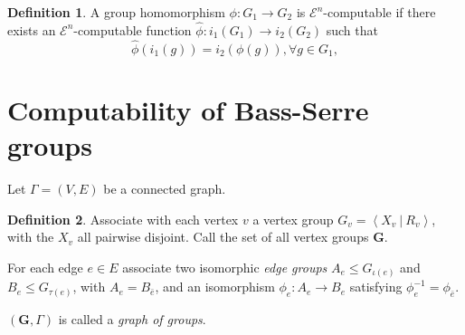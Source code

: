 \documentclass[a4paper]{article}
\newcommand{\grz}[1]{$\mathcal{E}^{#1}$}	%
\newcommand{\ZZ}{\mathbb{Z}}
\newcommand{\present}[2]{\left \langle #1 \: | \: #2 \right \rangle}	%
\theoremstyle{plain}
\newtheorem{theorem}{Theorem}[section]
\theoremstyle{definition}
\newtheorem{definition}[theorem]{Definition}
\begin{document}
\begin{definition}
	A group homomorphism $\phi: G_1 \rightarrow G_2$ is \grz{n}-computable if there exists an \grz{n}-computable function $\hat{\phi}: i_1(G_1) \rightarrow i_2(G_2)$ such that
\[	\hat{\phi}(i_1(g)) = i_2(\phi(g)), \forall g \in G_1, \]
\end{definition}

\begin{comment}
		\begin{definition} \cite[Definition 3.3]{Cannonito_1973}
			A group $G$ is ``standard'' relative to an index $(i,m,j)$ if $i$ is defined by minimalisation from a presentation $1 \rightarrow K \rightarrow F \rightarrow G \rightarrow 1$ for $F$ free on at most countably many generators, $n \geq 3$, and $A \subset \ZZ_{\geq 0}$.
		\end{definition}

		\begin{theorem} \cite[Theorem 3.4]{Cannonito_1973}
			If $G$ is finitely generated and \grz{n}$(A)$ for $n \geq 3$ then any standard index of $G$ is \grz{n}$(A)$.
		\end{theorem}
\end{comment}

\section{Computability of Bass-Serre groups \label{bass-serre}}

Let $\Gamma = (V,E)$ be a connected graph. 

\begin{definition}
Associate with each vertex $v$ a vertex group $G_v = \present{X_v}{R_v}$, with the $X_v$ all pairwise disjoint. Call the set of all vertex groups $\mathbf{G}$. 

For each edge $e \in E$ associate two isomorphic {\it edge groups} $A_e \leq G_{\iota(e)}$ and $B_e \leq G_{\tau(e)}$, with $A_e = B_{\bar{e}}$, and an isomorphism $\phi_e : A_e \rightarrow B_e$ satisfying $\phi_e^{-1} = \phi_{\bar{e}}$.

$(\mathbf{G},\Gamma)$ is called a {\it graph of groups}.
\end{definition}
\end{document}
